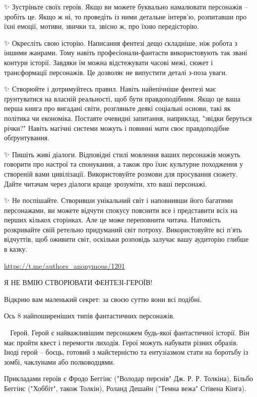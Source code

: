✨ Зустріньте своїх героїв. 
Якщо ви можете буквально намалювати персонажів – зробіть це. Якщо ж ні, то проведіть із ними детальне інтерв'ю, розпитавши про їхні емоції, мотиви, звички та, звісно ж, про їхню передісторію. 

✨ Окресліть свою історію. 
Написання фентезі дещо складніше, ніж робота з іншими жанрами. Тому навіть професіонали-фантасти використовують так звані контури історії. Завдяки їм можна відстежувати часові межі, сюжет і трансформації персонажів. Це дозволяє не випустити деталі з-поза уваги.

✨ Створюйте і дотримуйтесь правил. 
Навіть найепічніше фентезі має ґрунтуватися на власній реальності, щоб бути правдоподібним. Якщо це ваша перша книга про вигадані світи, розгляньте деякі соціальні основи, такі як політика чи економіка. Поставте очевидні запитання, наприклад, "звідки беруться річки?" Навіть магічні системи можуть і повинні мати своє правдоподібне обґрунтування.

✨ Пишіть живі діалоги. 
Відповідні стилі мовлення ваших персонажів можуть говорити про настрої та спонукання, а також про їхнє культурне походження у створеній вами цивілізації. Використовуйте розмови для просування сюжету. Дайте читачам через діалоги краще зрозуміти, хто ваші персонажі.

✨ Не поспішайте. 
Створивши унікальний світ і наповнивши його багатими персонажами, ви можете відчути спокусу пояснити все і представити всіх на перших кількох сторінках. Але це може переповнити читача. Натомість розкривайте свій ретельно придуманий світ потроху. Використовуйте всі п’ять відчуттів, щоб оживити світ, оскільки розповідь залучає вашу аудиторію глибше в казку.

\url{https://t.me/authors_anonymous/1201}

Я НЕ ВМІЮ СТВОРЮВАТИ ФЕНТЕЗІ-ГЕРОЇВ!

Відкрию вам маленький секрет: за своєю суттю вони всі подібні.

Ось 8 найпоширеніших типів фантастичних персонажів.

🦸‍♂️ Герой. 
Герой є найважливішим персонажем будь-якої фантастичної історії. Він має пройти квест і перемогти лиходія. Герої можуть набувати різних образів. Іноді герой – боєць, готовий з майстерністю та ентузіазмом стати на боротьбу із зомбі, чаклунами або полководцями. 

Прикладами героїв є Фродо Беггінс ("Володар перснів" Дж. Р. Р. Толкіна), Більбо Беггінс ("Хоббіт", також Толкін), Роланд Дешайн ("Темна вежа" Стівена Кінга).

